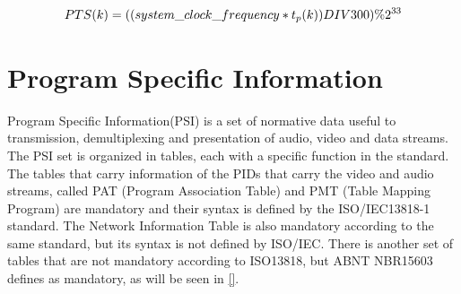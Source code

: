 \documentclass[
	12pt,				%
	openright,			%
	twoside,			%
	a4paper,			%
	brazil,
	french,				%
	english
	]{abntex2}
\begin{document}
\begin{equation}
PTS(k) = ((system\_clock\_frequency * t_p(k)) DIV 300) \% 2^{33}\\
\label{eq:pts}
\end{equation}





\section{Program Specific Information}

Program Specific Information(PSI) is a set of normative data useful to transmission, demultiplexing and presentation of audio, video and data streams. The PSI set is organized in tables, each with a specific function in the standard. The tables that carry information of the PIDs that carry the video and audio streams, called PAT (Program Association Table) and PMT (Table Mapping Program) are mandatory and their syntax is defined by the ISO/IEC13818-1 standard. The Network Information Table is also mandatory according to the same standard, but its syntax is not defined by ISO/IEC. There is another set of tables that are not mandatory according to ISO13818, but ABNT NBR15603 defines as mandatory, as will be seen in \autoref{}.
\end{document}
